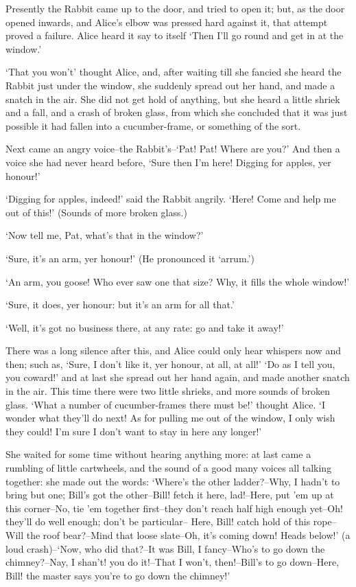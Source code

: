\documentclass[statementpaper,twoside,openany]{memoir}
\begin{document}
Presently the Rabbit came up to the door, and tried to open it; but, as the door opened inwards, and Alice's elbow was pressed hard against it, that attempt proved a failure. Alice heard it say to itself `Then I'll go round and get in at the window.'

`That you won't' thought Alice, and, after waiting till she fancied she heard the Rabbit just under the window, she suddenly spread out her hand, and made a snatch in the air. She did not get hold of anything, but she heard a little shriek and a fall, and a crash of broken glass, from which she concluded that it was just possible it had fallen into a cucumber-frame, or something of the sort.

Next came an angry voice--the Rabbit's--`Pat! Pat! Where are you?' And then a voice she had never heard before, `Sure then I'm here! Digging for apples, yer honour!'

`Digging for apples, indeed!' said the Rabbit angrily. `Here! Come and help me out of this!' (Sounds of more broken glass.)

`Now tell me, Pat, what's that in the window?'

`Sure, it's an arm, yer honour!' (He pronounced it `arrum.')

`An arm, you goose! Who ever saw one that size? Why, it fills the whole window!'

`Sure, it does, yer honour: but it's an arm for all that.'

`Well, it's got no business there, at any rate: go and take it away!'

There was a long silence after this, and Alice could only hear whispers now and then; such as, `Sure, I don't like it, yer honour, at all, at all!' `Do as I tell you, you coward!' and at last she spread out her hand again, and made another snatch in the air. This time there were two little shrieks, and more sounds of broken glass. `What a number of cucumber-frames there must be!' thought Alice. `I wonder what they'll do next! As for pulling me out of the window, I only wish they could! I'm sure I don't want to stay in here any longer!'

She waited for some time without hearing anything more: at last came a rumbling of little cartwheels, and the sound of a good many voices all talking together: she made out the words: `Where's the other ladder?--Why, I hadn't to bring but one; Bill's got the other--Bill! fetch it here, lad!--Here, put 'em up at this corner--No, tie 'em together first--they don't reach half high enough yet--Oh! they'll do well enough; don't be particular-- Here, Bill! catch hold of this rope--Will the roof bear?--Mind that loose slate--Oh, it's coming down! Heads below!' (a loud crash)--`Now, who did that?--It was Bill, I fancy--Who's to go down the chimney?--Nay, I shan't! you do it!--That I won't, then!--Bill's to go down--Here, Bill! the master says you're to go down the chimney!'
\end{document}
